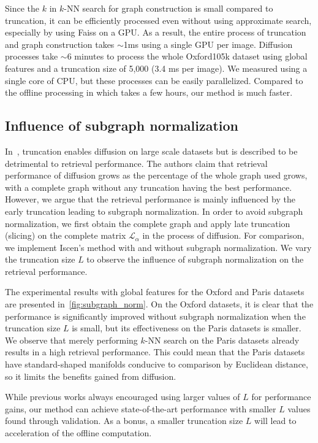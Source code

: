 \documentclass[letterpaper]{article} \usepackage{aaai19}  \usepackage{times}  \usepackage{helvet}  \usepackage{courier}  \usepackage{url}  \usepackage{graphicx}  \frenchspacing  \setlength{\pdfpagewidth}{8.5in}  \setlength{\pdfpageheight}{11in}
\begin{document}
Since the $k$ in $k$-NN search for graph construction is small compared to truncation, it can be efficiently processed even without using approximate search, especially by using Faiss on a GPU.
As a result, the entire process of truncation and graph construction takes $\sim$1ms using a single GPU per image.
Diffusion processes take $\sim$6 minutes to process the whole Oxford105k dataset using global features and a truncation size of 5,000 (3.4 ms per image).
We measured using a single core of CPU, but these processes can be easily parallelized.
Compared to the offline processing in \cite{iscen2018fast} which takes a few hours, our method is much faster.


\subsection{Influence of subgraph normalization}

In~\cite{iscen2017efficient}, truncation enables diffusion on large scale datasets but is described to be detrimental to retrieval performance.
The authors claim that retrieval performance of diffusion grows as the percentage of the whole graph used grows, with a complete graph without any truncation having the best performance.
However, we argue that the retrieval performance is mainly influenced by the early truncation leading to subgraph normalization.
In order to avoid subgraph normalization, we first obtain the complete graph and apply late truncation (slicing) on the complete matrix $\mathcal{L}_\alpha$ in the process of diffusion.
For comparison, we implement Iscen's method with and without subgraph normalization.
We vary the truncation size $L$ to observe the influence of subgraph normalization on the retrieval performance.

The experimental results with global features for the Oxford and Paris datasets are presented in~\cref{fig:subgraph_norm}.
On the Oxford datasets, it is clear that the performance is significantly improved without subgraph normalization when the truncation size $L$ is small, but its effectiveness on the Paris datasets is smaller.
We observe that merely performing $k$-NN search on the Paris datasets already results in a high retrieval performance.
This could mean that the Paris datasets have standard-shaped manifolds conducive to comparison by Euclidean distance, so it limits the benefits gained from diffusion.


While previous works always encouraged using larger values of $L$ for performance gains, our method can achieve state-of-the-art performance with smaller $L$ values found through validation.
As a bonus, a smaller truncation size $L$ will lead to acceleration of the offline computation.
\end{document}
